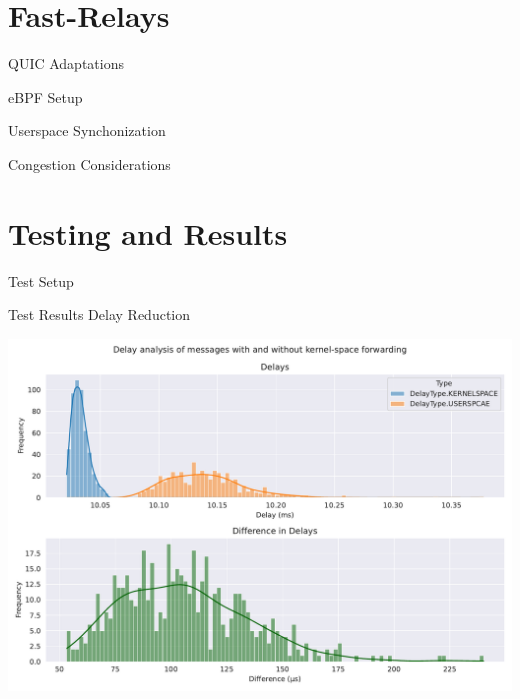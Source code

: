 \documentclass[shortpres,aspectratio=43]{beamer}
\begin{document}

\section{Fast-Relays}

\begin{frame}{}
  \tableofcontents[currentsection]
\end{frame}

\begin{frame}{QUIC Adaptations}
\end{frame}

\begin{frame}{eBPF Setup}
\end{frame}

\begin{frame}{Userspace Synchonization}
\end{frame}

\begin{frame}{Congestion Considerations}
\end{frame}


\section{Testing and Results}

\begin{frame}{}
  \tableofcontents[currentsection]
\end{frame}

\begin{frame}{Test Setup}
\end{frame}

\begin{frame}{Test Results Delay Reduction}
    \begin{minipage}{\textwidth}
        \centering
        \includegraphics[scale=0.4]{../figures/04_testing_and_results/delays_small_packets_simple_userspace.pdf}
    \end{minipage}\hfill
\end{frame}
\end{document}
